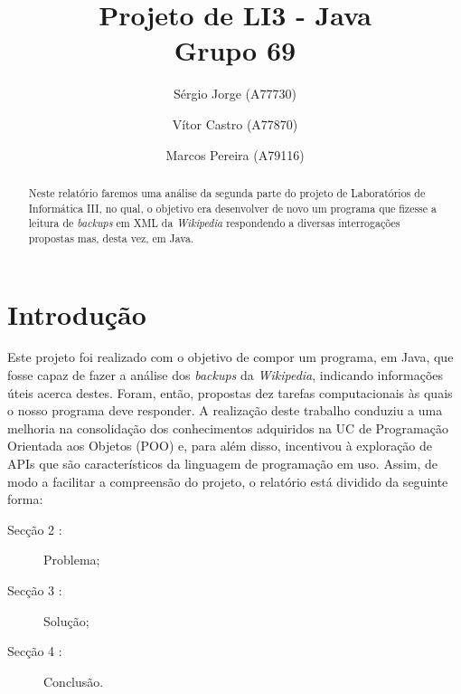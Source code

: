 \documentclass[a4paper]{article}
\title{Projeto de LI3 - Java\\Grupo 69}
\author{Sérgio Jorge (A77730) \and Vítor Castro (A77870) \and Marcos Pereira (A79116)}
\date{}
\begin{document}
\maketitle

\begin{abstract}
Neste relatório faremos uma análise da segunda parte do projeto de Laboratórios de Informática III, no qual, o objetivo era desenvolver de novo um programa que fizesse a leitura de \textit{backups} em XML da \textit{Wikipedia} respondendo a diversas interrogações propostas mas, desta vez, em Java.
\end{abstract}

\tableofcontents

\section{Introdução}
\label{sec:intro}
Este projeto foi realizado com o objetivo de compor um programa, em Java, que fosse capaz de fazer a análise dos \textit{backups} da \textit{Wikipedia}, indicando informações úteis acerca destes.
Foram, então, propostas dez tarefas computacionais às quais o nosso programa deve responder. 
A realização deste trabalho conduziu a uma melhoria na consolidação dos conhecimentos adquiridos na UC de Programação Orientada aos Objetos (POO) e, para além disso, incentivou à exploração de APIs que são característicos da linguagem de programação em uso.
Assim, de modo a facilitar a compreensão do projeto, o relatório está dividido da seguinte forma:


\begin{description}
    \item[Secção 2 :] Problema;
    \item[Secção 3 :] Solução;
    \item[Secção 4 :] Conclusão.
\end{description}
\end{document}

